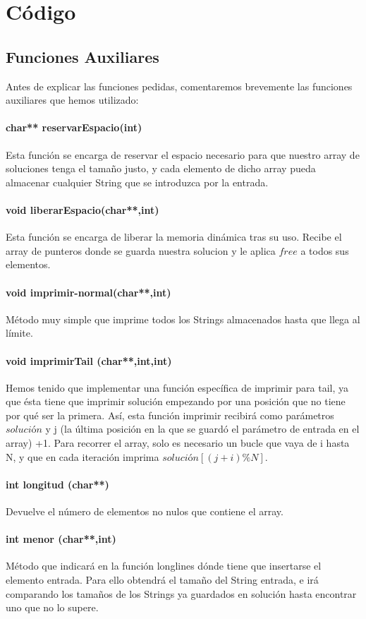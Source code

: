 \chapter{Código}
\section{Funciones Auxiliares}
Antes de explicar las funciones pedidas, comentaremos brevemente las funciones auxiliares que hemos utilizado: 
\subsubsection{char** reservarEspacio(int)}
Esta función se encarga de reservar el espacio necesario para que nuestro array de soluciones tenga el tamaño justo, y cada elemento de dicho array pueda almacenar cualquier String que se introduzca por la entrada.
\subsubsection{void liberarEspacio(char**,int)}
Esta función se encarga de liberar la memoria dinámica tras su uso. Recibe el array de punteros donde se guarda nuestra solucion y le aplica $free$ a todos sus elementos.
\subsubsection{void imprimir-normal(char**,int)}
Método muy simple que imprime todos los Strings almacenados hasta que llega al límite.
\subsubsection{void imprimirTail (char**,int,int)}
Hemos tenido que implementar una función específica de imprimir para tail, ya que ésta tiene que imprimir solución empezando por una posición que no tiene por qué ser la primera.
Así, esta función imprimir recibirá como parámetros $solución$ y j (la última posición en la que se guardó el parámetro de entrada en el array) +1. Para recorrer el array, solo es necesario un bucle que vaya de i hasta N, y que en cada iteración imprima $solución[(j+i)\%N]$.
\subsubsection{int longitud (char**)}
Devuelve el número de elementos no nulos que contiene el array.
\subsubsection{int menor (char**,int)}
Método que indicará en la función longlines dónde tiene que insertarse el elemento entrada. Para ello obtendrá el tamaño del String entrada, e irá comparando los tamaños de los Strings ya guardados en solución hasta encontrar uno que no lo supere.
